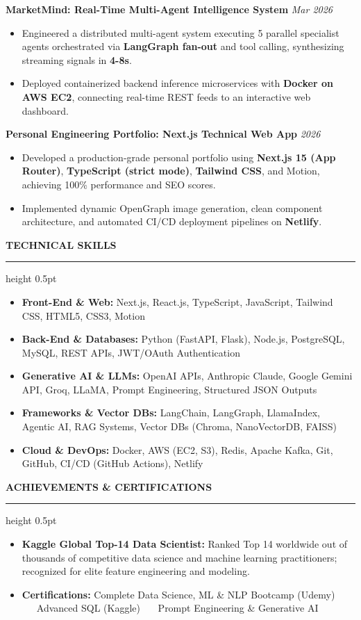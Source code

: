 \documentclass[10pt,letterpaper]{article}
\newcommand{\resumesection}[1]{%
  \vspace{3.5pt}%
  {\fontsize{10.5pt}{12pt}\selectfont\textbf{\MakeUppercase{#1}}}%
  \vspace{1.5pt}%
  \hrule height 0.5pt%
  \vspace{2.5pt}%
}
\begin{document}
\vspace{2pt}
\noindent\textbf{MarketMind: Real-Time Multi-Agent Intelligence System} \hfill \textit{Mar 2026}
\begin{itemize}
  \item Engineered a distributed multi-agent system executing 5 parallel specialist agents orchestrated via \textbf{LangGraph fan-out} and tool calling, synthesizing streaming signals in \textbf{4-8s}.
  \item Deployed containerized backend inference microservices with \textbf{Docker on AWS EC2}, connecting real-time REST feeds to an interactive web dashboard.
\end{itemize}

\vspace{2pt}
\noindent\textbf{Personal Engineering Portfolio: Next.js Technical Web App} \hfill \textit{2026}
\begin{itemize}
  \item Developed a production-grade personal portfolio using \textbf{Next.js 15 (App Router)}, \textbf{TypeScript (strict mode)}, \textbf{Tailwind CSS}, and Motion, achieving 100\% performance and SEO scores.
  \item Implemented dynamic OpenGraph image generation, clean component architecture, and automated CI/CD deployment pipelines on \textbf{Netlify}.
\end{itemize}

\resumesection{Technical Skills}
\begin{itemize}[leftmargin=0pt, label={}]
  \item \textbf{Front-End \& Web:} Next.js, React.js, TypeScript, JavaScript, Tailwind CSS, HTML5, CSS3, Motion
  \item \textbf{Back-End \& Databases:} Python (FastAPI, Flask), Node.js, PostgreSQL, MySQL, REST APIs, JWT/OAuth Authentication
  \item \textbf{Generative AI \& LLMs:} OpenAI APIs, Anthropic Claude, Google Gemini API, Groq, LLaMA, Prompt Engineering, Structured JSON Outputs
  \item \textbf{Frameworks \& Vector DBs:} LangChain, LangGraph, LlamaIndex, Agentic AI, RAG Systems, Vector DBs (Chroma, NanoVectorDB, FAISS)
  \item \textbf{Cloud \& DevOps:} Docker, AWS (EC2, S3), Redis, Apache Kafka, Git, GitHub, CI/CD (GitHub Actions), Netlify
\end{itemize}

\resumesection{Achievements \& Certifications}
\begin{itemize}
  \item \textbf{Kaggle Global Top-14 Data Scientist:} Ranked Top 14 worldwide out of thousands of competitive data science and machine learning practitioners; recognized for elite feature engineering and modeling.
  \item \textbf{Certifications:} Complete Data Science, ML \& NLP Bootcamp (Udemy) \ \textbar\ \ Advanced SQL (Kaggle) \ \textbar\ \ Prompt Engineering \& Generative AI
\end{itemize}
\end{document}
